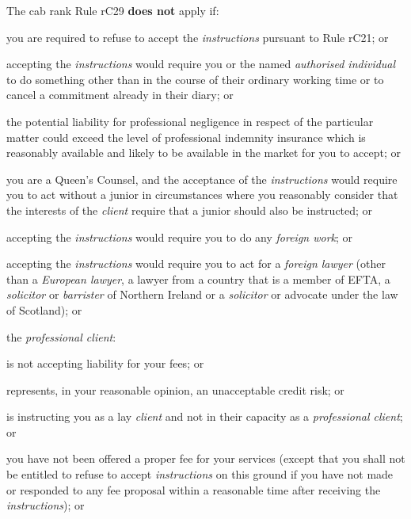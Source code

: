 The cab rank Rule rC29 \textcolor{myred}{\textbf{does not}} apply if:
\begin{numlist}
\item you are required to refuse to accept the \emph{instructions} pursuant
to Rule rC21; or

\item accepting the \emph{instructions} would require you or the named
\emph{authorised individual} to do something other than in the course of
their ordinary working time or to cancel a commitment already in their
diary; or

\item the potential liability for professional negligence in respect of the
particular matter could exceed the level of professional indemnity
insurance which is reasonably available and likely to be available in
the market for you to accept; or

\item you are a Queen's Counsel, and the acceptance of the
\emph{instructions} would require you to act without a junior in
circumstances where you reasonably consider that the interests of the
\emph{client} require that a junior should also be instructed; or

\item accepting the \emph{instructions} would require you to do any
\emph{foreign work}; or

\item accepting the \emph{instructions} would require you to act for a
\emph{foreign lawyer} (other than a \emph{European lawyer}, a lawyer
from a country that is a member of EFTA, a \emph{solicitor} or
\emph{barrister} of Northern Ireland or a \emph{solicitor} or advocate
under the law of Scotland); or

\item the \emph{professional client}:
\begin{alphlist}
\item is not accepting liability for your fees; or

\item represents, in your reasonable opinion, an unacceptable credit risk;
or

\item is instructing you as a lay \emph{client} and not in their capacity as a \emph{professional client}; or
\end{alphlist}
\item you have not been offered a proper fee for your services (except that
you shall not be entitled to refuse to accept \emph{instructions} on
this ground if you have not made or responded to any fee proposal within
a reasonable time after receiving the \emph{instructions}); or


\end{numlist}
